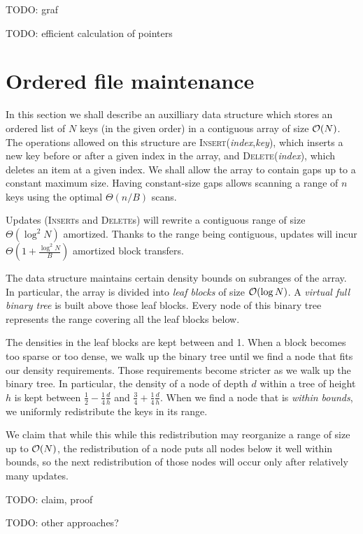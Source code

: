 TODO: graf

TODO: efficient calculation of pointers

\section{Ordered file maintenance}
In this section we shall describe an auxilliary data structure which stores
an ordered list of $N$ keys (in the given order) in a contiguous array of
size $\mathcal{O}(N)$. The operations allowed on this structure are
\textsc{Insert}(\textit{index},\textit{key}), which inserts a new key before
or after a given index in the array, and \textsc{Delete}(\textit{index}),
which deletes an item at a given index.
We shall allow the array to contain gaps up to a constant maximum size.
Having constant-size gaps allows scanning a range of $n$ keys using the
optimal $\Theta(n/B)$ scans.

Updates (\textsc{Insert}s and \textsc{Delete}s) will rewrite a contiguous
range of size $\Theta(\log^2 N)$ amortized. Thanks to the range being
contiguous, updates will incur $\Theta(1+\frac{\log^2 N}{B})$ amortized
block transfers.

The data structure maintains certain density bounds on subranges of the array.
In particular, the array is divided into \textit{leaf blocks} of size $\mathcal{O}(\log N)$.
A \textit{virtual full binary tree} is built above those leaf blocks. Every
node of this binary tree represents the range covering all the leaf blocks below.

The densities in the leaf blocks are kept between  %
and 1. When a block becomes too sparse or too dense, we walk up the binary
tree until we find a node that fits our density requirements.
Those requirements become stricter as we walk up the binary tree.
In particular, the density of a node of depth $d$ within a tree of height $h$
is kept between $\frac{1}{2}-\frac{1}{4}\frac{d}{h}$ and $\frac{3}{4}+\frac{1}{4}\frac{d}{h}$.
When we find a node that is \textit{within bounds}, we uniformly redistribute
the keys in its range.

We claim that while this while this redistribution may reorganize a range
of size up to $\mathcal{O}(N)$, the redistribution of a node puts all nodes below it
well within bounds, so the next redistribution of those nodes will occur
only after relatively many updates. %

TODO: claim, proof

TODO: other approaches?
